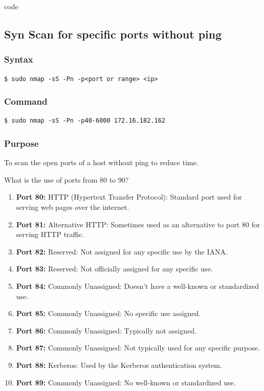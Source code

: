 code \documentclass[11pt]{article}
\begin{document}
\subsection{Syn Scan for specific ports without ping}
\subsubsection{Syntax}
\begin{verbatim}
$ sudo nmap -sS -Pn -p<port or range> <ip>
\end{verbatim}

\subsubsection*{Command}
\begin{verbatim}
$ sudo nmap -sS -Pn -p40-6000 172.16.182.162
\end{verbatim}

\subsubsection*{Purpose}
To scan the open ports of a host without ping to reduce time.

What is the use of ports from 80 to 90?

\begin{enumerate}
    \item \textbf{Port 80:} HTTP (Hypertext Transfer Protocol): Standard port used for serving web pages over the internet.
    \item \textbf{Port 81:} Alternative HTTP: Sometimes used as an alternative to port 80 for serving HTTP traffic.
    \item \textbf{Port 82:} Reserved: Not assigned for any specific use by the IANA.
    \item \textbf{Port 83:} Reserved: Not officially assigned for any specific use.
    \item \textbf{Port 84:} Commonly Unassigned: Doesn't have a well-known or standardized use.
    \item \textbf{Port 85:} Commonly Unassigned: No specific use assigned.
    \item \textbf{Port 86:} Commonly Unassigned: Typically not assigned.
    \item \textbf{Port 87:} Commonly Unassigned: Not typically used for any specific purpose.
    \item \textbf{Port 88:} Kerberos: Used by the Kerberos authentication system.
    \item \textbf{Port 89:} Commonly Unassigned: No well-known or standardized use.
\end{enumerate}
\end{document}
